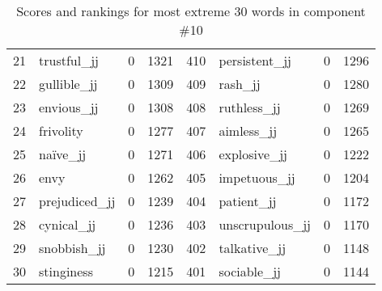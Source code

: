 \begin{table}[tbp]
\begin{tabular}{| rlr@{.}l | rlr@{.}l |}
    21 & trustful\_jj & 0 & 1321    &    410 & persistent\_jj & 0 & 1296 \\
    22 & gullible\_jj & 0 & 1309    &    409 & rash\_jj & 0 & 1280 \\
    23 & envious\_jj & 0 & 1308    &    408 & ruthless\_jj & 0 & 1269 \\
    24 & frivolity & 0 & 1277    &    407 & aimless\_jj & 0 & 1265 \\
    25 & naïve\_jj & 0 & 1271    &    406 & explosive\_jj & 0 & 1222 \\
    26 & envy & 0 & 1262    &    405 & impetuous\_jj & 0 & 1204 \\
    27 & prejudiced\_jj & 0 & 1239    &    404 & patient\_jj & 0 & 1172 \\
    28 & cynical\_jj & 0 & 1236    &    403 & unscrupulous\_jj & 0 & 1170 \\
    29 & snobbish\_jj & 0 & 1230    &    402 & talkative\_jj & 0 & 1148 \\
    30 & stinginess & 0 & 1215    &    401 & sociable\_jj & 0 & 1144 \\
    \hline
    \end{tabular}
    \caption{Scores and rankings for most extreme 30 words in component \#10} 
\end{table}
\clearpage
